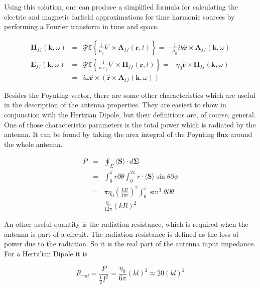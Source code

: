 \documentclass[a4paper,14pt]{extbook}
\begin{document}
Using this solution, one can produce a simplified formula for calculating the electric and magnetic farfield approximations for time harmonic sources by performing a Fourier transform in time and space.

\begin{eqnarray}
\mathbf{H}_{ff} (\mathbf{k},\omega)&=& \mathfrak{FT} \left\{ \frac{1}{\mu_0} \nabla \times \mathbf{A}_{ff}(\mathbf{r},t) \right\} = - \frac{1}{\mu_0} ik\mathbf{\hat{r}} \times \mathbf{A}_{ff}(\mathbf{k},\omega) \label{rule_Hff}\\
\mathbf{E}_{ff} (\mathbf{k},\omega)&=&  \mathfrak{FT} \left\{ \frac{1}{i\omega \varepsilon_0 } \nabla \times \mathbf{H}_{ff}(\mathbf{r},t) \right\}= -\eta_0 \mathbf{\hat{r}} \times \mathbf{H}_{ff}(\mathbf{k},\omega) \\
&=& i \omega \mathbf{\hat{r}} \times ( \mathbf{\hat{r}} \times \mathbf{A}_{ff}(\mathbf{k},\omega)) \label{rule_Eff}
\end{eqnarray}

Besides the Poynting vector, there are some other characteristics which are useful in the description of the antenna properties. They are easiest to show in conjunction with the Hertzian Dipole, but their definitions are, of course, general. One of those characteristic parameters is the total power which is radiated by the antenna. It can be found by taking the area integral of the Poynting flux around the whole antenna.

\begin{eqnarray}\label{total_power_hd}
P &=& \oint_\Sigma \langle \mathbf{S} \rangle \cdot d\mathbf{\Sigma} \\
&=& \int_0^{\pi} r\partial \theta \int_0^{2\pi } r\cdot \langle \mathbf{S} \rangle \sin \theta \partial \phi \nonumber \\
&=& \pi \eta_0 \left( \frac{ k I l}{4 \pi r}\right)^2 \int_0^{\pi} \sin^3 \theta\partial \theta \nonumber \\
&=& \frac{\eta_0}{12 \pi} (kIl)^2 \nonumber
\end{eqnarray}

An other useful quantity is the radiation resistance, which is required when the antenna is part of a circuit. The radiation resistance is defined as the loss of power due to the radiation. So it is the real part of the antenna input impedance. For a Hertz'ian Dipole it is

\begin{equation}\label{radiation_resistance_hd}
R_{rad} = \frac{P}{\frac{1}{2} I^2} = \frac{\eta_0}{6\pi}(kl)^2 \approx 20 (kl)^2
\end{equation}
\end{document}

